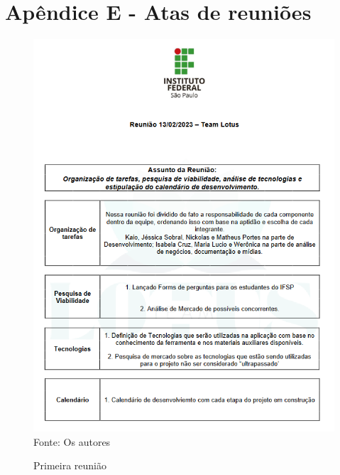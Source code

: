 \documentclass[12pt,a4paper]{article}
\begin{document}
\section{Apêndice E  - Atas de reuniões}
\begin{figure}[H]
    \centering
    \caption{Primeira reunião}
     \includegraphics[width=15cm]{ilus1.png}
     Fonte: Os autores
     \label{fig07}
\end{figure}

\newpage
\end{document}
